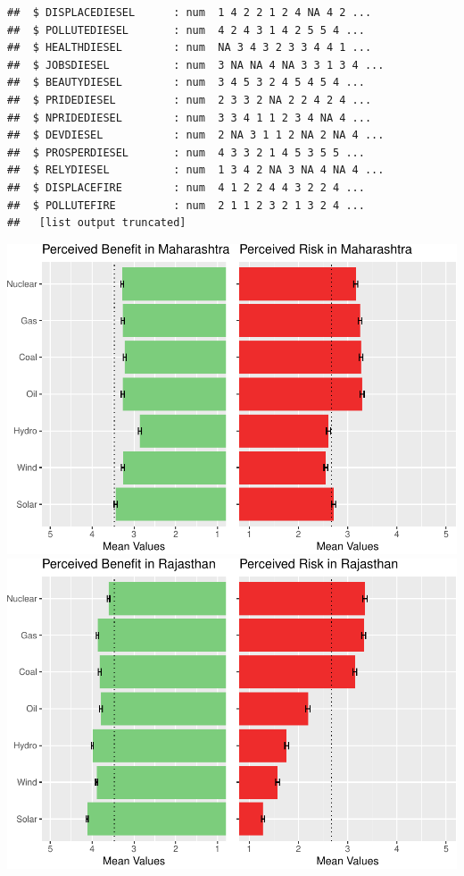 \documentclass[
]{article}
\begin{document}
\begin{verbatim}
##  $ DISPLACEDIESEL      : num  1 4 2 2 1 2 4 NA 4 2 ...
##  $ POLLUTEDIESEL       : num  4 2 4 3 1 4 2 5 5 4 ...
##  $ HEALTHDIESEL        : num  NA 3 4 3 2 3 3 4 4 1 ...
##  $ JOBSDIESEL          : num  3 NA NA 4 NA 3 3 1 3 4 ...
##  $ BEAUTYDIESEL        : num  3 4 5 3 2 4 5 4 5 4 ...
##  $ PRIDEDIESEL         : num  2 3 3 2 NA 2 2 4 2 4 ...
##  $ NPRIDEDIESEL        : num  3 3 4 1 1 2 3 4 NA 4 ...
##  $ DEVDIESEL           : num  2 NA 3 1 1 2 NA 2 NA 4 ...
##  $ PROSPERDIESEL       : num  4 3 3 2 1 4 5 3 5 5 ...
##  $ RELYDIESEL          : num  1 3 4 2 NA 3 NA 4 NA 4 ...
##  $ DISPLACEFIRE        : num  4 1 2 2 4 4 3 2 2 4 ...
##  $ POLLUTEFIRE         : num  2 1 1 2 3 2 1 3 2 4 ...
##   [list output truncated]
\end{verbatim}

\includegraphics{nuclear-in-comparison_files/figure-latex/unnamed-chunk-18-1.pdf}
\includegraphics{nuclear-in-comparison_files/figure-latex/unnamed-chunk-18-2.pdf}
\end{document}
